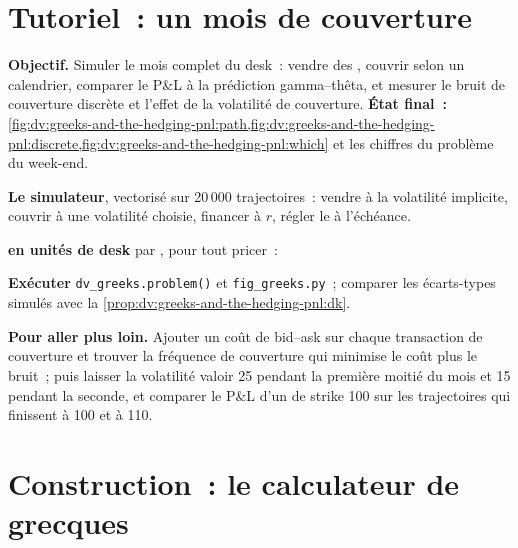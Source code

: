 \section{Tutoriel~: un mois de couverture}\label{tut:dv:greeks-and-the-hedging-pnl:tut}

\begin{tutorial}
\textbf{Objectif.} Simuler le mois complet du desk~: vendre des , couvrir selon
un calendrier, comparer le P\&L à la prédiction gamma--thêta, et mesurer le
bruit de couverture discrète et l'effet de la volatilité de couverture. \textbf{État final~:}
\cref{fig:dv:greeks-and-the-hedging-pnl:path,fig:dv:greeks-and-the-hedging-pnl:discrete,fig:dv:greeks-and-the-hedging-pnl:which}
et les chiffres du problème du week-end.
\begin{tutsteps}
\item \textbf{Le simulateur}, vectorisé sur 20\,000 trajectoires~: vendre à la volatilité implicite, couvrir
à une volatilité choisie, financer à $r$, régler le  à l'échéance.
\label{lst:dv:greeks-and-the-hedging-pnl:sim}
\item \textbf{ en unités de desk} par , pour tout pricer~:
\label{lst:dv:greeks-and-the-hedging-pnl:bump}
\item \textbf{Exécuter} \texttt{dv\_greeks.problem()} et \texttt{fig\_greeks.py}~; comparer
les écarts-types simulés avec la \cref{prop:dv:greeks-and-the-hedging-pnl:dk}.
\end{tutsteps}
\textbf{Pour aller plus loin.} Ajouter un coût de bid--ask sur chaque transaction de couverture et trouver la
fréquence de couverture qui minimise le coût plus le bruit~; puis laisser la volatilité valoir 25 pendant la
première moitié du mois et 15 pendant la seconde, et comparer le P\&L d'un 
de strike 100 sur les trajectoires qui finissent à 100 et à 110.
\end{tutorial}

\section{Construction~: le calculateur de grecques}\label{bld:dv:greeks-and-the-hedging-pnl:greeks}

